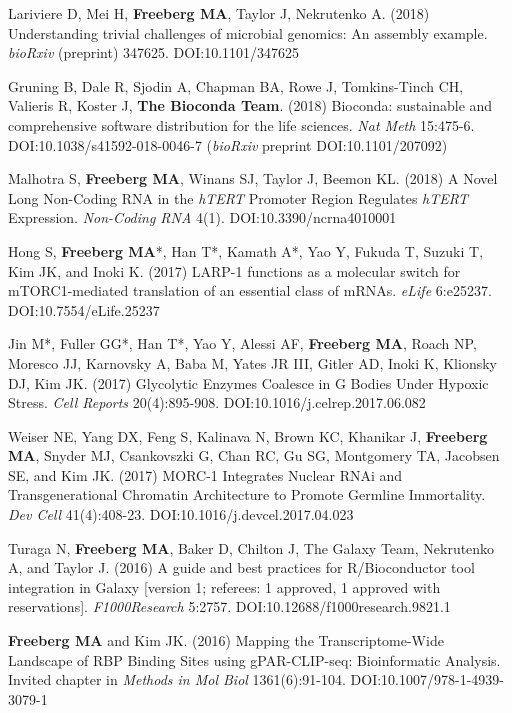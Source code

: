 \documentclass[margin,line]{res}
\begin{document}
\begin{resume}
Lariviere D, Mei H, {\bf Freeberg MA}, Taylor J, Nekrutenko A. (2018) Understanding trivial challenges of microbial genomics: An assembly example. {\em bioRxiv} (preprint) 347625. DOI:10.1101/347625

Gruning B, Dale R, Sjodin A, Chapman BA, Rowe J, Tomkins-Tinch CH, Valieris R, Koster J, {\bf The Bioconda Team}. (2018) Bioconda: sustainable and comprehensive software distribution for the life sciences. {\em Nat Meth} 15:475-6. DOI:10.1038/s41592-018-0046-7 ({\em bioRxiv} preprint DOI:10.1101/207092)

Malhotra S, {\bf Freeberg MA}, Winans SJ, Taylor J, Beemon KL. (2018) A Novel Long Non-Coding RNA in the {\em hTERT} Promoter Region Regulates {\em hTERT} Expression. {\em Non-Coding RNA} 4(1). DOI:10.3390/ncrna4010001


Hong S, {\bf Freeberg MA}*, Han T*, Kamath A*, Yao Y, Fukuda T, Suzuki T, Kim JK, and Inoki K. (2017) LARP-1 functions as a molecular switch for mTORC1-mediated translation of an essential class of mRNAs. {\em eLife} 6:e25237. DOI:10.7554/eLife.25237

Jin M*, Fuller GG*, Han T*, Yao Y, Alessi AF, {\bf Freeberg MA}, Roach NP, Moresco JJ, Karnovsky A, Baba M, Yates JR III, Gitler AD, Inoki K, Klionsky DJ, Kim JK. (2017) Glycolytic Enzymes Coalesce in G Bodies Under Hypoxic Stress. {\em Cell Reports} 20(4):895-908. DOI:10.1016/j.celrep.2017.06.082

Weiser NE, Yang DX, Feng S, Kalinava N, Brown KC, Khanikar J, {\bf Freeberg MA}, Snyder MJ, Csankovszki G, Chan RC,  Gu SG, Montgomery TA, Jacobsen SE, and Kim JK. (2017) MORC-1 Integrates Nuclear RNAi and Transgenerational Chromatin Architecture to Promote Germline Immortality. {\em Dev Cell} 41(4):408-23. DOI:10.1016/j.devcel.2017.04.023

Turaga N, {\bf Freeberg MA}, Baker D, Chilton J, The Galaxy Team, Nekrutenko A, and Taylor J. (2016) A guide and best practices for R/Bioconductor tool integration in Galaxy [version 1; referees: 1 approved, 1 approved with reservations]. {\em F1000Research} 5:2757. DOI:10.12688/f1000research.9821.1

{\bf Freeberg MA} and Kim JK. (2016) Mapping the Transcriptome-Wide Landscape of RBP Binding Sites using gPAR-CLIP-seq: Bioinformatic Analysis. Invited chapter in {\em Methods in Mol Biol} 1361(6):91-104. DOI:10.1007/978-1-4939-3079-1


\end{resume}
\end{document}
